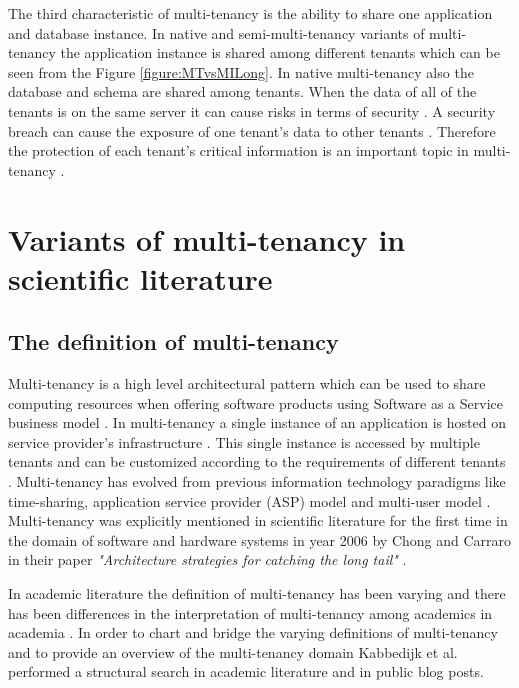 \documentclass[conference]{sasmoota2017}
\begin{document}
The third characteristic of multi-tenancy is the ability to share one application and database instance. In native and semi-multi-tenancy variants of multi-tenancy the application instance is shared among different tenants which can be seen from the Figure \ref{figure:MTvsMILong}. In native multi-tenancy also the database and schema are shared among tenants. When the data of all of the tenants is on the same server it can cause risks in terms of security \cite{Bezemer:2010:EnablingMultiTenancy}. A security breach can cause the exposure of one tenant's data to other tenants \cite{Bezemer:2010:MaintenanceDream}. Therefore the protection of each tenant's critical information is an important topic in multi-tenancy \cite{Guo:2007:FrameworkForNative}.


\section{Variants of multi-tenancy in scientific literature}

\subsection{The definition of multi-tenancy}

Multi-tenancy is a high level architectural pattern which can be used to share computing resources when offering software products using Software as a Service business model \cite{Kabbedijk2015:Defining}. In multi-tenancy a single instance of an application is hosted on service provider's infrastructure \cite{Kabbedijk2015:Defining}. This single instance is accessed by multiple tenants and can be customized according to the requirements of different tenants \cite{Kabbedijk2015:Defining}. Multi-tenancy has evolved from previous information technology paradigms like time-sharing, application service provider (ASP) model and multi-user model \cite{Kabbedijk2015:Defining}. Multi-tenancy was explicitly mentioned in scientific literature for the first time in the domain of software and hardware systems in year 2006 \cite{Kabbedijk2015:Defining} by Chong and Carraro in their paper \textit{"Architecture strategies for catching the long tail"} \cite{Carraro:2006:ArchitectureLongTail}.  

In academic literature the definition of multi-tenancy has been varying and there has been differences in the interpretation of multi-tenancy among academics in academia \cite{Kabbedijk2015:Defining}. In order to chart and bridge the varying definitions of multi-tenancy and to provide an overview of the multi-tenancy domain Kabbedijk et al. \cite{Kabbedijk2015:Defining} performed a structural search in academic literature and in public blog posts. 
\end{document}
